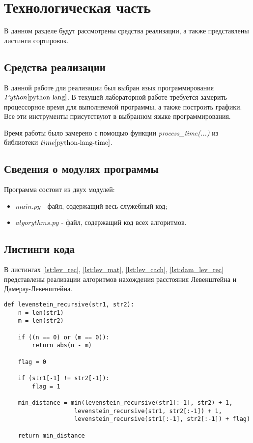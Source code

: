 \chapter{Технологическая часть}

В данном разделе будут рассмотрены средства реализации, а также представлены листинги сортировок.

\section{Средства реализации}
В данной работе для реализации был выбран язык программирования $Python \cite{python-lang}$. В текущей лабораторной работе требуется замерить процессорное время для выполняемой программы, а также построить графики. Все эти инструменты присутствуют в выбранном языке программирования.

Время работы было замерено с помощью функции \textit{process\_time(...)} из библиотеки $time \cite{python-lang-time}$.

\section{Сведения о модулях программы}
Программа состоит из двух модулей:
\begin{itemize}
	\item $main.py$ - файл, содержащий весь служебный код;
    \item $algorythms.py$ - файл, содержащий код всех алгоритмов. \newline
\end{itemize}


\section{Листинги кода}

В листингах \ref{lst:lev_rec}, \ref{lst:lev_mat}, \ref{lst:lev_cach},  \ref{lst:dam_lev_rec} представлены реализации алгоритмов нахождения расстояния Левенштейна и Дамерау-Левенштейна.

\clearpage

\begin{center}
    \captionsetup{justification=raggedright,singlelinecheck=off}
    \begin{lstlisting}[label=lst:lev_rec,caption=Алгоритм нахождения расстояния Левенштейна (реккурсивный)]
def levenstein_recursive(str1, str2):
    n = len(str1)
    m = len(str2)

    if ((n == 0) or (m == 0)):
        return abs(n - m)

    flag = 0

    if (str1[-1] != str2[-1]):
        flag = 1

    min_distance = min(levenstein_recursive(str1[:-1], str2) + 1,
                    levenstein_recursive(str1, str2[:-1]) + 1,
                    levenstein_recursive(str1[:-1], str2[:-1]) + flag)

    return min_distance
\end{lstlisting}
\end{center}


